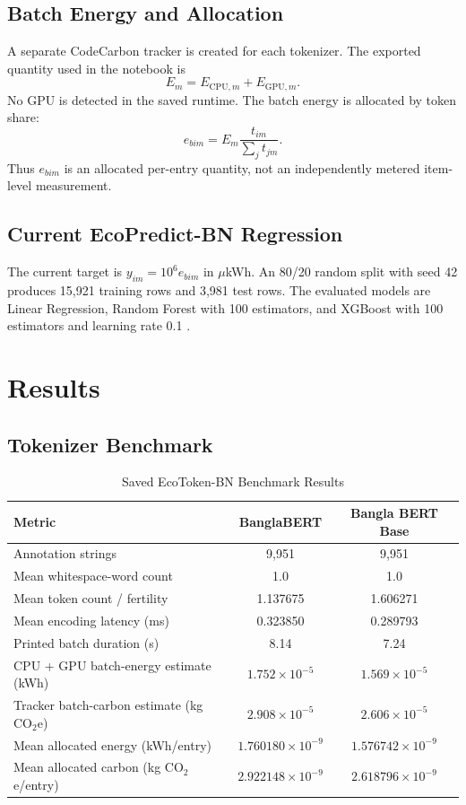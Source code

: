 \documentclass[conference]{IEEEtran}
\begin{document}
\subsection{Batch Energy and Allocation}
A separate CodeCarbon tracker is created for each tokenizer. The exported quantity used in the notebook is
\begin{equation}
E_m=E_{\mathrm{CPU},m}+E_{\mathrm{GPU},m}.
\end{equation}
No GPU is detected in the saved runtime. The batch energy is allocated by token share:
\begin{equation}
e_{bim}=E_m\frac{t_{im}}{\sum_jt_{jm}}.
\label{eq:allocation}
\end{equation}
Thus $e_{bim}$ is an allocated per-entry quantity, not an independently metered item-level measurement.

\subsection{Current EcoPredict-BN Regression}
The current target is $y_{im}=10^6e_{bim}$ in $\mu$kWh. An 80/20 random split with seed 42 produces 15,921 training rows and 3,981 test rows. The evaluated models are Linear Regression, Random Forest with 100 estimators, and XGBoost with 100 estimators and learning rate 0.1 \cite{chen2016}.

\section{Results}
\subsection{Tokenizer Benchmark}
\begin{table}[t]
\caption{Saved EcoToken-BN Benchmark Results}
\label{tab:benchmark}
\centering
\scriptsize
\begin{tabular}{lcc}
\toprule
\textbf{Metric} & \textbf{BanglaBERT} & \textbf{Bangla BERT Base}\\
\midrule
Annotation strings & 9,951 & 9,951\\
Mean whitespace-word count & 1.0 & 1.0\\
Mean token count / fertility & 1.137675 & 1.606271\\
Mean encoding latency (ms) & 0.323850 & 0.289793\\
Printed batch duration (s) & 8.14 & 7.24\\
CPU + GPU batch-energy estimate (kWh) & $1.752\times10^{-5}$ & $1.569\times10^{-5}$\\
Tracker batch-carbon estimate (kg CO$_2$e) & $2.908\times10^{-5}$ & $2.606\times10^{-5}$\\
Mean allocated energy (kWh/entry) & $1.760180\times10^{-9}$ & $1.576742\times10^{-9}$\\
Mean allocated carbon (kg CO$_2$e/entry) & $2.922148\times10^{-9}$ & $2.618796\times10^{-9}$\\
\bottomrule
\end{tabular}
\end{table}
\end{document}
